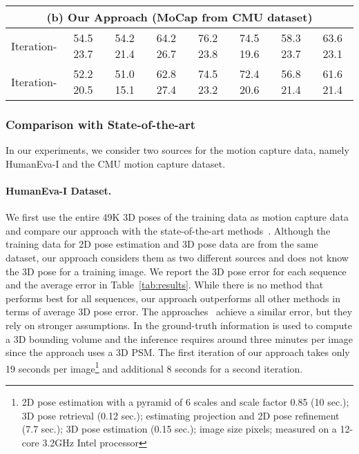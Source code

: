 \documentclass[10pt,twocolumn,letterpaper]{article}
\newcommand{\rom}[1]{\textup{\uppercase\expandafter{\romannumeral#1}}
}
\begin{document}
\begin{table*}[t]
{\begin{tabular}{|l||c|c|c||c|c|c||c|}
\multicolumn{8}{|c|}{\textbf{(b)} Our Approach (MoCap from CMU dataset)}                                                                                                                \\ \hline
Iteration-\rom{1}                   & 54.5  23.7   &  54.2  21.4   &  64.2  26.7   & 76.2  23.8  &  74.5  19.6     & 58.3  23.7           & 63.6   23.1 \\ \hline
Iteration-\rom{2}                   & 52.2  20.5   &  51.0  15.1   &  62.8  27.4   & 74.5  23.2  &  72.4  20.6     & 56.8  21.4           & 61.6   21.4 \\ \hline
\end{tabular}
}
\caption{Comparison with other state-of-the-art approaches on the HumanEva-I dataset. The average 3D pose error (mm) and standard deviation are reported for all three subjects (S1, S2, S3) and camera C1. * denotes a different evaluation protocol.
\textbf{(a)} Results of the proposed approach with one or two iterations and motion capture data from the HumanEva-I dataset. \textbf{(b)} Results with motion capture data from the CMU dataset.
}
\vspace{-3mm}
\label{tab:results}
\end{table*}
\vspace{-4mm}
\subsubsection{Comparison with State-of-the-art}\label{exp:comp}
In our experiments, we consider two sources for the motion capture data, namely HumanEva-I and the CMU motion capture dataset.
\vspace{-3.5mm}
\paragraph{HumanEva-I Dataset.}
We first use the entire 49K 3D poses of the training data as motion capture data and compare our approach with the state-of-the-art methods~\cite{Ilya_2014,Wang_2014_CVPR,SimoSerraCVPR2013,SimoSerraCVPR2012,Bo-2010,Radwan-2013iccv}. Although the training data for 2D pose estimation and 3D pose data are from the same dataset, our approach considers them as two different sources and does not know the 3D pose for a training image. We report the 3D pose error for each sequence and the average error in Table~\ref{tab:results}.
While there is no method that performs best for all sequences, our approach outperforms all other methods in terms of average 3D pose error. The approaches~\cite{Ilya_2014, Bo-2010} achieve a similar error, but they rely on stronger assumptions. In \cite{Ilya_2014} the ground-truth information is used to compute a 3D bounding volume and the inference requires around three minutes per image since the approach uses a 3D PSM.
The first iteration of our approach takes only 19 seconds per image\footnote{2D pose estimation with a pyramid of 6 scales and scale factor 0.85 (10 sec.); 3D pose retrieval (0.12 sec.); estimating projection and 2D pose refinement (7.7 sec.); 3D pose estimation (0.15 sec.); image size  pixels; measured on a 12-core 3.2GHz Intel processor}
and additional 8 seconds for a second iteration.
\end{document}
